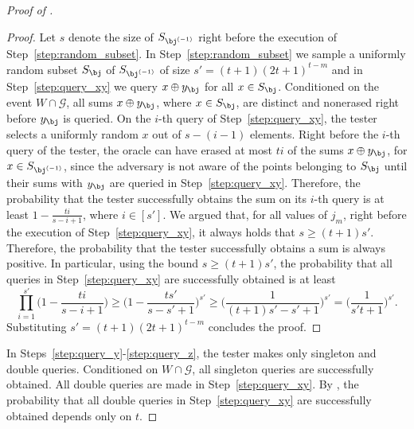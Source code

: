 \documentclass[11pt]{article}
\numberwithin{equation}{section}
\theoremstyle{definition}
\theoremstyle{plain}
\begin{document}
\begin{proof}[Proof of ]
\begin{proof}
%
Let $s$ denote the size of $S_{\bj^{(-1)}}$ right before the execution of Step~\ref{step:random_subset}. In  Step~\ref{step:random_subset} we sample a uniformly random subset $S_{\bj}$ of $S_{\bj^{(-1)}}$ of size $s' = (t+1)(2t+1)^{t-m}$ and in Step~\ref{step:query_xy} we query $x \oplus y_{\bj}$ for all $x \in S_{\bj}$. Conditioned on the event $W \cap \mathcal{G}$, all sums $x \oplus  y_{\bj}$, where $x\in S_{\bj}$, are distinct and nonerased right before $y_{\bj}$ is queried. On the $i$-th query of Step~\ref{step:query_xy}, the tester selects a uniformly random $x$ out of $s-(i-1)$ elements. Right before the $i$-th query of the tester, the oracle can have erased at most $ti$ of the sums $x \oplus y_{\bj}$, for $x \in S_{\bj^{(-1)}}$, since the adversary is not aware of the points belonging to $S_{\bj}$ until their sums with $ y_{\bj}$ are queried in Step~\ref{step:query_xy}. Therefore, the probability that the tester successfully obtains the sum on its $i$-th query is at least $1 - \frac{ti}{s-i+1}$, where $i \in [s']$. We argued that, for all values of $j_m$, right before the execution of Step~\ref{step:query_xy}, it always holds that $s \geq (t+1)s'$. Therefore, the probability that the tester successfully obtains a sum is always positive. In particular, using the bound $s \geq (t+1)s'$, the probability that all queries in Step~\ref{step:query_xy} are successfully obtained is at least
\begin{equation*}
        \prod_{i=1}^{s'} \Big( 1 - \frac{ti}{s-i + 1} \Big) 
        \geq \Big( 1 - \frac{ts'}{s-s' + 1} \Big)^{s'} 
        \geq \Big( \frac{1}{(t+1)s' - s' + 1} \Big)^{s'}
        =  \Big(\frac{1}{s't+1} \Big)^{s'}.
    \end{equation*}
Substituting $s' = (t+1)(2t+1)^{t-m}$ concludes the proof. 
\end{proof}
 
In Steps~\ref{step:query_y}-\ref{step:query_z}, the tester makes only singleton and double queries. Conditioned on $W \cap \mathcal{G}$, all singleton queries are successfully obtained. All double queries are made in Step~\ref{step:query_xy}. By , the probability that all double queries in Step~\ref{step:query_xy} are successfully obtained depends only on $t$. 
    

\end{proof}
\end{document}

